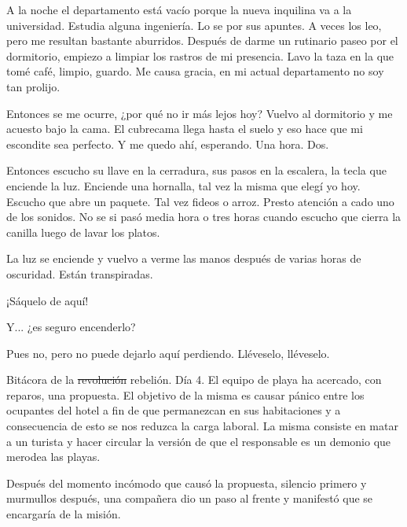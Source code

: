 \documentclass[12pt,twoside,openright,a5paper]{book}
\begin{document}
A la noche el departamento está vacío porque la nueva inquilina va a la
universidad. Estudia alguna ingeniería. Lo se por sus apuntes. A veces los
leo, pero me resultan bastante aburridos. Después de darme un rutinario
paseo por el dormitorio, empiezo a limpiar los rastros de mi presencia. Lavo
la taza en la que tomé café, limpio, guardo. Me causa gracia, en mi
actual departamento no soy tan prolijo.

Entonces se me ocurre, ¿por qué no ir más lejos hoy? Vuelvo al dormitorio
y me acuesto bajo la cama. El cubrecama llega hasta el suelo y eso hace
que mi escondite sea perfecto. Y me quedo ahí, esperando. Una hora. Dos.

Entonces escucho su llave en la cerradura, sus pasos en la escalera, la tecla
que enciende la luz. Enciende una hornalla, tal vez la misma que elegí yo
hoy. Escucho que abre un paquete. Tal vez fideos o arroz. Presto atención
a cado uno de los sonidos. No se si pasó media hora o tres horas cuando
escucho que cierra la canilla luego de lavar los platos.

La luz se enciende y vuelvo a verme las manos después de varias horas de
oscuridad. Están transpiradas.


\vspace{0.5cm}
\hrulefill\hspace{0.2cm} \decofourleft\decofourright \hspace{0.2cm} \hrulefill
\vspace{0.5cm}

¡Sáquelo de aquí!

Y... ¿es seguro encenderlo?

Pues no, pero no puede dejarlo aquí perdiendo. Lléveselo, lléveselo.


\vspace{0.5cm}
\hrulefill\hspace{0.2cm} \decofourleft\decofourright \hspace{0.2cm} \hrulefill
\vspace{0.5cm}

Bitácora de la \st{revolución} rebelión. Día 4. El equipo de playa ha acercado, con
reparos, una propuesta. El objetivo de la misma es causar pánico entre
los ocupantes del hotel a fin de que permanezcan en sus habitaciones y a
consecuencia de esto se nos reduzca la carga laboral. La misma consiste en
matar a un turista y hacer circular la versión de que el responsable es un
demonio que merodea las playas.

Después del momento incómodo que causó
la propuesta, silencio primero y murmullos después, una compañera dio
un paso al frente y manifestó que se encargaría de la misión.
\end{document}
